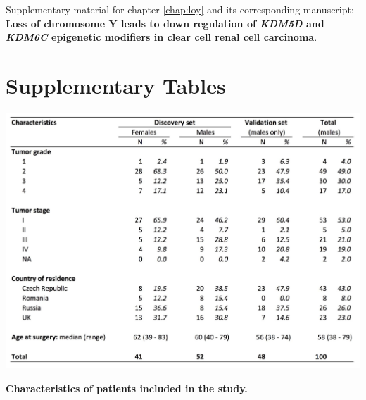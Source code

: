 Supplementary material for chapter \ref{chap:loy} and its corresponding manuscript: {\bf Loss of chromosome Y leads to down regulation of {\it KDM5D} and {\it KDM6C} epigenetic modifiers in clear cell renal cell carcinoma}.


\setcounter{figure}{0}
\renewcommand{\thefigure}{S\ref{chap:loy}.\arabic{figure}}
\setcounter{table}{0}
\renewcommand{\thetable}{S\ref{chap:loy}.\arabic{table}}

\section*{Supplementary Tables}

\begin{table}[ht]
  \centering
  \includegraphics[width=.9\linewidth]{figures/LOY-tabS1.jpg}
  \caption[Characteristics of patients included in the study]{{\bf Characteristics of patients included in the study.}}
  \label{tab:loyS1}
\end{table}

